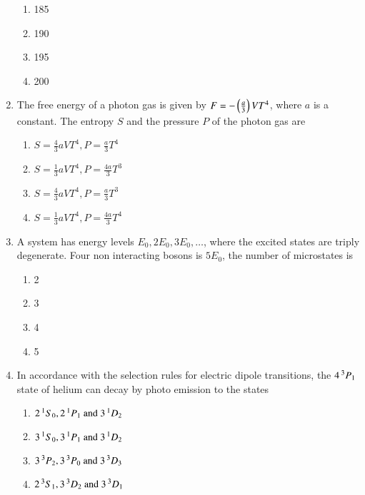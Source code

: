 \documentclass[journal]{IEEEtran}
\begin{document}
\begin{enumerate}[start=35]
\begin{multicols}{4}
\begin{enumerate}
        \item 185
        \item 190
        \item 195
        \item 200
    \end{enumerate}
\end{multicols}
\item The free energy of a photon gas is given by $F=-\left(\frac{a}{3}\right)VT^4$, where $a$ is a constant. The entropy $S$ and the pressure $P$ of the photon gas are
\begin{multicols}{2}
    \begin{enumerate}
        \item $S=\frac{4}{3}aVT^4, P=\frac{a}{3}T^4$
        \item $S=\frac{1}{3}aVT^4, P=\frac{4a}{3}T^3$
        \item $S=\frac{4}{3}aVT^4, P=\frac{a}{3}T^3$
        \item $S=\frac{1}{3}aVT^4, P=\frac{4a}{3}T^4$
    \end{enumerate}
\end{multicols}
\item A system has energy levels $E_0,2E_0,3E_0,\dots$, where the excited states are triply degenerate. Four non interacting bosons is $5E_0$, the number of microstates is
\begin{multicols}{4}
    \begin{enumerate}
        \item 2
        \item 3
        \item 4
        \item 5
    \end{enumerate}
\end{multicols}
\item In accordance with the selection rules for electric dipole transitions, the $4\prescript{3}{}{P}_1$ state of helium can decay by photo emission to the states
\begin{multicols}{2}
    \begin{enumerate}
        \item $2\prescript{1}{}{S}_0,2\prescript{1}{}{P}_1 \text{ and } 3\prescript{1}{}{D}_2$
        \item $3\prescript{1}{}{S}_0,3\prescript{1}{}{P}_1 \text{ and } 3\prescript{1}{}{D}_2$
        \item $3\prescript{3}{}{P}_2,3\prescript{3}{}{P}_0 \text{ and } 3\prescript{3}{}{D}_3$
        \item $2\prescript{3}{}{S}_1,3\prescript{3}{}{D}_2 \text{ and } 3\prescript{3}{}{D}_1$

\end{enumerate}
\end{multicols}
\end{enumerate}
\end{document}
